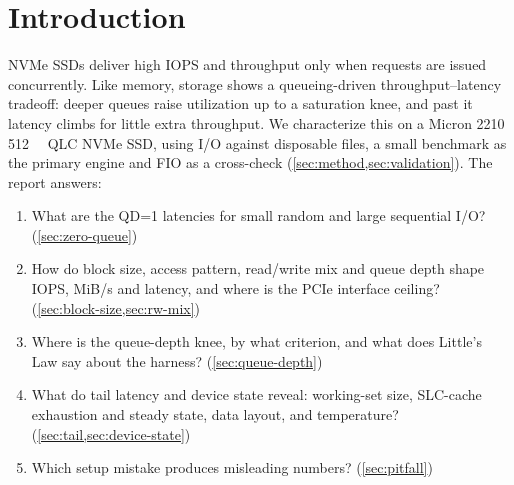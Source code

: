\section{Introduction}\label{sec:intro}

NVMe SSDs deliver high IOPS and throughput only when requests are issued concurrently. Like memory,
storage shows a queueing-driven throughput--latency tradeoff: deeper queues raise utilization up to a
saturation knee, and past it latency climbs for little extra throughput. We characterize this on a
Micron 2210 \qty{512}{\giga\byte} QLC NVMe SSD, using  I/O against disposable files, a
small  benchmark as the primary engine and FIO as a cross-check
(\cref{sec:method,sec:validation}). The report answers:
\begin{enumerate}
  \item What are the QD=1 latencies for small random and large sequential I/O? (\cref{sec:zero-queue})
  \item How do block size, access pattern, read/write mix and queue depth shape IOPS, MiB/s and latency,
        and where is the PCIe interface ceiling? (\cref{sec:block-size,sec:rw-mix})
  \item Where is the queue-depth knee, by what criterion, and what does Little's Law say about the
        harness? (\cref{sec:queue-depth})
  \item What do tail latency and device state reveal: working-set size, SLC-cache exhaustion and steady
        state, data layout, and temperature? (\cref{sec:tail,sec:device-state})
  \item Which setup mistake produces misleading numbers? (\cref{sec:pitfall})
\end{enumerate}
